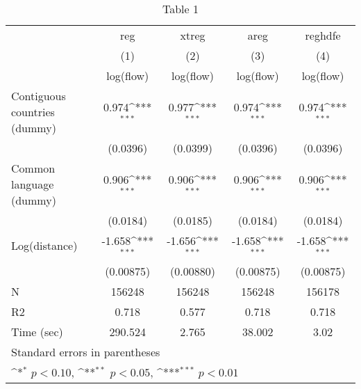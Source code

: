 \begin{table}[htbp]\centering
\def\sym#1{\ifmmode^{#1}\else\(^{#1}\)\fi}
\caption{Table 1}
\begin{tabular}{l*{4}{c}}
\hline\hline
                    &\multicolumn{1}{c}{reg}         &\multicolumn{1}{c}{xtreg}         &\multicolumn{1}{c}{areg}         &\multicolumn{1}{c}{reghdfe}         \\
                    &\multicolumn{1}{c}{(1)}&\multicolumn{1}{c}{(2)}&\multicolumn{1}{c}{(3)}&\multicolumn{1}{c}{(4)}\\
                    &\multicolumn{1}{c}{log(flow)}&\multicolumn{1}{c}{log(flow)}&\multicolumn{1}{c}{log(flow)}&\multicolumn{1}{c}{log(flow)}\\
\hline
Contiguous countries (dummy)&       0.974\sym{***}&       0.977\sym{***}&       0.974\sym{***}&       0.974\sym{***}\\
                    &    (0.0396)         &    (0.0399)         &    (0.0396)         &    (0.0396)         \\
[1em]
Common language (dummy)&       0.906\sym{***}&       0.906\sym{***}&       0.906\sym{***}&       0.906\sym{***}\\
                    &    (0.0184)         &    (0.0185)         &    (0.0184)         &    (0.0184)         \\
[1em]
Log(distance)       &      -1.658\sym{***}&      -1.656\sym{***}&      -1.658\sym{***}&      -1.658\sym{***}\\
                    &   (0.00875)         &   (0.00880)         &   (0.00875)         &   (0.00875)         \\
\hline
N                   &      156248         &      156248         &      156248         &      156178         \\
R2                  &       0.718         &       0.577         &       0.718         &       0.718         \\
Time (sec)          &     290.524         &       2.765         &      38.002         &        3.02         \\
\hline\hline
\multicolumn{5}{l}{\footnotesize Standard errors in parentheses}\\
\multicolumn{5}{l}{\footnotesize \sym{*} \(p<0.10\), \sym{**} \(p<0.05\), \sym{***} \(p<0.01\)}\\
\end{tabular}
\end{table}
